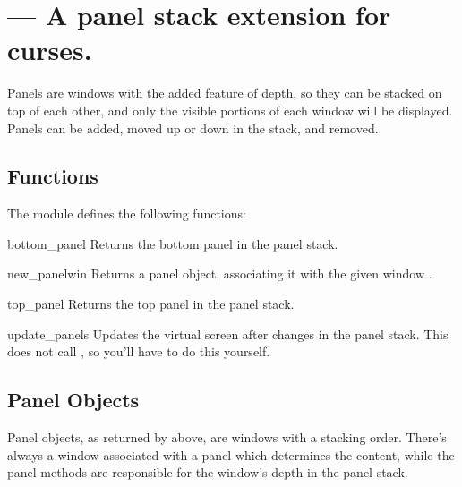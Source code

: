 \section{ ---
         A panel stack extension for curses.}


Panels are windows with the added feature of depth, so they can be
stacked on top of each other, and only the visible portions of
each window will be displayed.  Panels can be added, moved up
or down in the stack, and removed. 

\subsection{Functions \label{cursespanel-functions}}

The module  defines the following functions:


\begin{funcdesc}{bottom_panel}{}
Returns the bottom panel in the panel stack.
\end{funcdesc}

\begin{funcdesc}{new_panel}{win}
Returns a panel object, associating it with the given window .
\end{funcdesc}

\begin{funcdesc}{top_panel}{}
Returns the top panel in the panel stack.
\end{funcdesc}

\begin{funcdesc}{update_panels}{}
Updates the virtual screen after changes in the panel stack. This does
not call , so you'll have to do this yourself.
\end{funcdesc}

\subsection{Panel Objects \label{curses-panel-objects}}

Panel objects, as returned by  above, are windows
with a stacking order. There's always a window associated with a
panel which determines the content, while the panel methods are
responsible for the window's depth in the panel stack.

